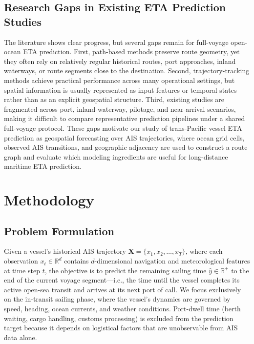 \documentclass[sigconf,anonymous]{acmart}%
\begin{document}
\subsection{Research Gaps in Existing ETA Prediction Studies}
The literature shows clear progress, but several gaps remain for full-voyage open-ocean ETA prediction.
First, path-based methods preserve route geometry, yet they often rely on relatively regular historical routes, port approaches, inland waterways, or route segments close to the destination.
Second, trajectory-tracking methods achieve practical performance across many operational settings, but spatial information is usually represented as input features or temporal states rather than as an explicit geospatial structure.
Third, existing studies are fragmented across port, inland-waterway, pilotage, and near-arrival scenarios, making it difficult to compare representative prediction pipelines under a shared full-voyage protocol.
These gaps motivate our study of trans-Pacific vessel ETA prediction as geospatial forecasting over AIS trajectories, where ocean grid cells, observed AIS transitions, and geographic adjacency are used to construct a route graph and evaluate which modeling ingredients are useful for long-distance maritime ETA prediction.

\section{Methodology}

\subsection{Problem Formulation}

Given a vessel's historical AIS trajectory $\mathbf{X} = \{x_1, x_2, \ldots, x_T\}$, where each observation $x_t \in \mathbb{R}^{d}$ contains $d$-dimensional navigation and meteorological features at time step $t$, the objective is to predict the remaining sailing time $\hat{y} \in \mathbb{R}^{+}$ to the end of the current voyage segment---i.e., the time until the vessel completes its active open-sea transit and arrives at its next port of call.
We focus exclusively on the in-transit sailing phase, where the vessel's dynamics are governed by speed, heading, ocean currents, and weather conditions. Port-dwell time (berth waiting, cargo handling, customs processing) is excluded from the prediction target because it depends on logistical factors that are unobservable from AIS data alone.
\end{document}
